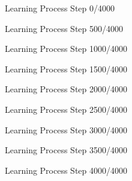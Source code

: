 \documentclass[12pt, aspectratio=169]{beamer}
\begin{document}
\begin{frame}{Learning Process Step 0/4000} 
	\centering 
	\scalebox{.9}{} 
\end{frame} 
\begin{frame}{Learning Process Step 500/4000} 
	\centering 
	\scalebox{.9}{} 
\end{frame} 
\begin{frame}{Learning Process Step 1000/4000} 
	\centering 
	\scalebox{.9}{} 
\end{frame} 
\begin{frame}{Learning Process Step 1500/4000} 
	\centering 
	\scalebox{.9}{} 
\end{frame} 
\begin{frame}{Learning Process Step 2000/4000} 
	\centering 
	\scalebox{.9}{} 
\end{frame} 
\begin{frame}{Learning Process Step 2500/4000} 
	\centering 
	\scalebox{.9}{} 
\end{frame} 
\begin{frame}{Learning Process Step 3000/4000} 
	\centering 
	\scalebox{.9}{} 
\end{frame} 
\begin{frame}{Learning Process Step 3500/4000} 
	\centering 
	\scalebox{.9}{} 
\end{frame} 
\begin{frame}{Learning Process Step 4000/4000} 
	\centering 
	\scalebox{.9}{} 
\end{frame} 
\end{document}
